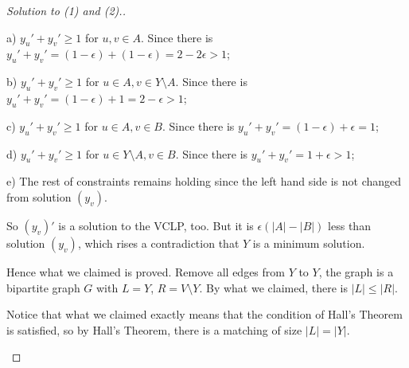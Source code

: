 \begin{proof}[Solution to (1) and (2).]
\begin{enumerate}
            a) $y_u'+y_v'\geq 1$ for $u,v\in A$. Since there is $y_u'+y_v'= (1-\epsilon)+(1-\epsilon)=2-2\epsilon>1$; 
            
            b) $y_u' + y_v' \geq 1$ for $u \in A, v \in Y \setminus A$. Since there is $y_u' + y_v' = (1 - \epsilon) + 1 = 2 - \epsilon > 1$;
    
            c) $y_u'+y_v'\geq 1$ for $u\in A, v\in B$. Since there is $y_u'+y_v' = (1-\epsilon) + \epsilon=1$;
            
            d) $y_u' + y_v' \geq 1$ for $u \in Y \setminus A, v \in B$. Since there is $y_u' + y_v' = 1 + \epsilon > 1$;
    
            e) The rest of constraints remains holding since the left hand side is not changed from solution $(y_v)$. 
    
            So $(y_v)'$ is a solution to the VCLP, too. But it is $\epsilon(|A|-|B|)$ less than solution $(y_v)$, which rises a contradiction that $Y$ is a minimum solution. 
        
            Hence what we claimed is proved. Remove all edges from $Y$ to $Y$, the graph is a bipartite graph $G$ with $L = Y$, $R = V \setminus Y$. By what we claimed, there is $|L|\leq|R|$.

            Notice that what we claimed exactly means that the condition of Hall's Theorem is satisfied, so by Hall's Theorem, there is a matching of size $|L|=|Y|$. 
        \end{enumerate}
    \end{proof}


